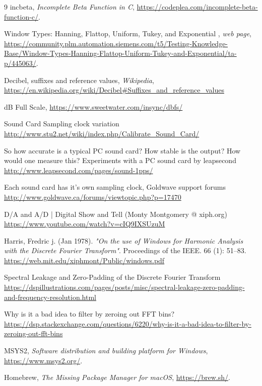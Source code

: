 \documentclass[10pt,a4paper]{report}
\begin{document}
\begin{thebibliography}{9}
	incbeta, 
	\textit{Incomplete Beta Function in C},
	\url{https://codeplea.com/incomplete-beta-function-c/}.
	
	Window Types: Hanning, Flattop, Uniform, Tukey, and Exponential ,
	\textit{web page},
	\url{https://community.plm.automation.siemens.com/t5/Testing-Knowledge-Base/Window-Types-Hanning-Flattop-Uniform-Tukey-and-Exponential/ta-p/445063/}.
	
	Decibel, suffixes and reference values,
	\textit{Wikipedia},
	\url{https://en.wikipedia.org/wiki/Decibel\#Suffixes_and_reference_values}

	dB Full Scale, 
	\url{https://www.sweetwater.com/insync/dbfs/}
	
	Sound Card Sampling clock variation
	\url{http://www.stu2.net/wiki/index.php/Calibrate_Sound_Card/}
	
	So how accurate is a typical PC sound card? How stable is the output? How would one measure this?
	Experiments with a PC sound card by leapsecond
	\url{http://www.leapsecond.com/pages/sound-1pps/}
	
	Each sound card has it's own sampling clock, Goldwave support forums
	\url{http://www.goldwave.ca/forums/viewtopic.php?p=17470}
	
	D/A and A/D | Digital Show and Tell (Monty Montgomery @ xiph.org)
	\url{https://www.youtube.com/watch?v=cIQ9IXSUzuM}
	
	Harris, Fredric j. (Jan 1978). \textit{"On the use of Windows for Harmonic Analysis with the Discrete Fourier Transform"}. Proceedings of the IEEE. 66 (1): 51–83.
	\url{https://web.mit.edu/xiphmont/Public/windows.pdf}
	
	Spectral Leakage and Zero-Padding of the Discrete Fourier Transform
	\url{https://dspillustrations.com/pages/posts/misc/spectral-leakage-zero-padding-and-frequency-resolution.html}
	
	Why is it a bad idea to filter by zeroing out FFT bins?
	\url{https://dsp.stackexchange.com/questions/6220/why-is-it-a-bad-idea-to-filter-by-zeroing-out-fft-bins}
	
	MSYS2,
	\textit{Software distribution and building platform for Windows},
	\url{https://www.msys2.org/}.

	Homebrew,
	\textit{The Missing Package Manager for macOS},
	\url{https://brew.sh/}.


\end{thebibliography}
\end{document}
